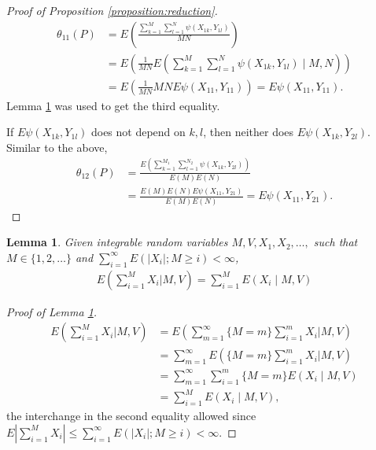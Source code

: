 \documentclass[12pt]{article}
\DeclareMathOperator{\AUC}{AUC}
\newcommand{\E}{E}
\renewcommand{\P}{P}
\newcommand{\cind}{\perp \!\!\! \perp}
\newcommand{\aucindiv}{\theta_{11}}%
\newcommand{\aucpop}{\theta_{12}}%
\newcommand{\kernel}{\psi}
\newtheorem{lemma}[theorem]{Lemma}
\begin{document}
\begin{proof}[Proof of Proposition \ref{proposition:reduction}]
  \begin{align}
    \aucindiv(\P) &= \E\left(\frac{\sum_{k=1}^M\sum_{l=1}^N\kernel(X_{1k},Y_{1l})}{MN}\right)\\
                  &=\E\left(\frac{1}{MN}\E\left(\sum_{k=1}^M\sum_{l=1}^N\kernel(X_{1k},Y_{1l}) \mid M,N\right)\right)\\
                  &=\E\left(\frac{1}{MN}MN\E\kernel(X_{11},Y_{11})\right) = \E\kernel(X_{11},Y_{11}).                    
  \end{align}
  Lemma \ref{lemma:conditional wald} was used to get the third equality.

  If $\E\kernel(X_{1k},Y_{1l})$ does not depend on $k,l$, then neither does $\E\kernel(X_{1k},Y_{2l})$. Similar to the above,
  \begin{align}
    \aucpop(\P) &= \frac{\E\left(\sum_{k=1}^{M_1}\sum_{l=1}^{N_2}\kernel(X_{1k},Y_{2l})\right)}{\E(M)\E(N)}\\
    &=\frac{\E(M)\E(N)\E\kernel(X_{11},Y_{21})}{\E(M)\E(N)} = \E\kernel(X_{11},Y_{21}).
  \end{align}
\end{proof}


\begin{lemma}\label{lemma:conditional wald}
  Given integrable random variables $M,V,X_1,X_2,\ldots,$ such that $M\in\{1,2,\ldots\}$ and $\sum_{i=1}^\infty E(|X_i|;M\ge i)<\infty$,
  \begin{align}
    \E\left(\sum_{i=1}^M X_i \bigg\vert M,V\right) = \sum_{i=1}^M \E(X_i\mid M,V)
  \end{align}
\end{lemma}
\begin{proof}[Proof of Lemma \ref{lemma:conditional wald}]
  \begin{align}
    \E\left(\sum_{i=1}^M X_i\bigg\vert M,V\right)
    &=  \E\left(\sum_{m=1}^\infty\{M=m\}\sum_{i=1}^m X_i\bigg\vert M,V\right)\\
    &= \sum_{m=1}^\infty \E\left(\{M=m\}\sum_{i=1}^m X_i\bigg\vert M,V\right)\\
    &=\sum_{m=1}^\infty \sum_{i=1}^m\{M=m\}\E(X_i\mid M,V)\\
    &=\sum_{i=1}^M\E(X_i\mid M,V),
  \end{align}
the interchange in the second equality allowed since $E\left|\sum_{i=1}^MX_i\right| \le \sum_{i=1}^\infty E(|X_i|;M\ge i)<\infty.$
\end{proof}
\end{document}
